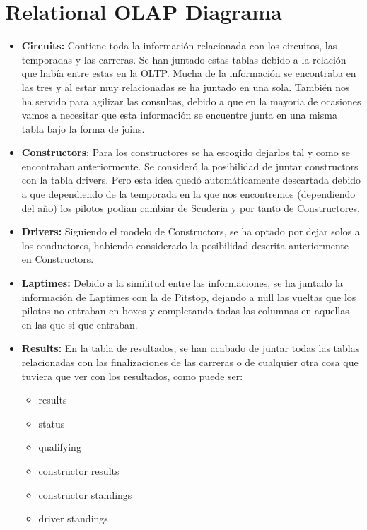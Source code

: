 \documentclass[a4paper 
,twoside
]{article}
\begin{document}
\pagebreak
\section{Relational OLAP Diagrama}
\begin{itemize}
  \item \textbf{Circuits:} Contiene toda la información relacionada con los circuitos, las temporadas y las carreras. Se han juntado estas tablas debido a la relación que había entre estas en la OLTP. Mucha de la información se encontraba en las tres y al estar muy relacionadas se ha juntado en una sola. También nos ha servido para agilizar las consultas, debido a que en la mayoria de ocasiones vamos a necesitar que esta información se encuentre junta en una misma tabla bajo la forma de joins.
  \item \textbf{Constructors}: Para los constructores se ha escogido dejarlos tal y como se encontraban anteriormente. Se consideró la posibilidad de juntar constructors con la tabla drivers. Pero esta idea quedó automáticamente descartada debido a que dependiendo de la temporada en la que nos encontremos (dependiendo del año) los pilotos podian cambiar de Scuderia y por tanto de Constructores.
  \item \textbf{Drivers:} Siguiendo el modelo de Constructors, se ha optado por dejar solos a los conductores, habiendo considerado la posibilidad descrita anteriormente en Constructors.
  \item \textbf{Laptimes:} Debido a la similitud entre las informaciones, se ha juntado la información de Laptimes con la de Pitstop, dejando a null las vueltas que los pilotos no entraban en boxes y completando todas las columnas en aquellas en las que si que entraban.
  \item \textbf{Results:} En la tabla de resultados, se han acabado de juntar todas las tablas relacionadas con las finalizaciones de las carreras o de cualquier otra cosa que tuviera que ver con los resultados, como puede ser: \begin{itemize}
    \item results
    \item status
    \item qualifying
    \item constructor results
    \item constructor standings 
    \item driver standings
  \end{itemize}

  
\end{itemize}

\pagebreak
\end{document}
